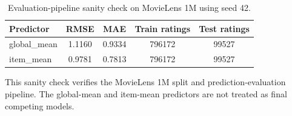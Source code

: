 \begin{table}[htbp]
\centering
\caption{Evaluation-pipeline sanity check on MovieLens 1M using seed 42.}
\label{tab:ml1m_baseline_smoke_test_seed42}
\begin{tabular}{lcccc}
\toprule
Predictor & RMSE & MAE & Train ratings & Test ratings \\
\midrule
global\_mean & 1.1160 & 0.9334 & 796172 & 99527 \\
item\_mean & 0.9781 & 0.7813 & 796172 & 99527 \\
\bottomrule
\end{tabular}
\vspace{0.35em}
\begin{minipage}{0.96\textwidth}
\footnotesize This sanity check verifies the MovieLens 1M split and prediction-evaluation pipeline. The global-mean and item-mean predictors are not treated as final competing models.
\end{minipage}
\end{table}
